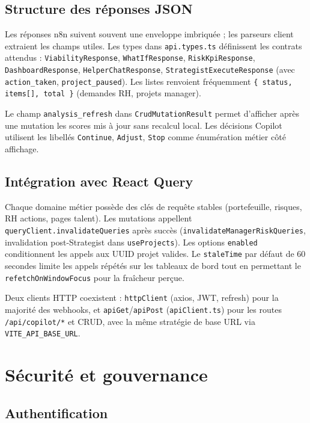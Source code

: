 \subsection{Structure des réponses JSON}

Les réponses n8n suivent souvent une enveloppe imbriquée ; les parseurs client extraient les champs utiles. Les types dans \texttt{api.types.ts} définissent les contrats attendus : \texttt{ViabilityResponse}, \texttt{WhatIfResponse}, \texttt{RiskKpiResponse}, \texttt{DashboardResponse}, \texttt{HelperChatResponse}, \texttt{StrategistExecuteResponse} (avec \texttt{action\_taken}, \texttt{project\_paused}). Les listes renvoient fréquemment \texttt{\{ status, items[], total \}} (demandes RH, projets manager).

Le champ \texttt{analysis\_refresh} dans \texttt{CrudMutationResult} permet d'afficher après une mutation les scores mis à jour sans recalcul local. Les décisions Copilot utilisent les libellés \texttt{Continue}, \texttt{Adjust}, \texttt{Stop} comme énumération métier côté affichage.

\subsection{Intégration avec React Query}

Chaque domaine métier possède des clés de requête stables (portefeuille, risques, RH actions, pages talent). Les mutations appellent \texttt{queryClient.invalidateQueries} après succès (\texttt{invalidateManagerRiskQueries}, invalidation post-Strategist dans \texttt{useProjects}). Les options \texttt{enabled} conditionnent les appels aux UUID projet valides. Le \texttt{staleTime} par défaut de 60 secondes limite les appels répétés sur les tableaux de bord tout en permettant le \texttt{refetchOnWindowFocus} pour la fraîcheur perçue.

Deux clients HTTP coexistent : \texttt{httpClient} (axios, JWT, refresh) pour la majorité des webhooks, et \texttt{apiGet}/\texttt{apiPost} (\texttt{apiClient.ts}) pour les routes \texttt{/api/copilot/*} et CRUD, avec la même stratégie de base URL via \texttt{VITE\_API\_BASE\_URL}.

\section{Sécurité et gouvernance}

\subsection{Authentification}


